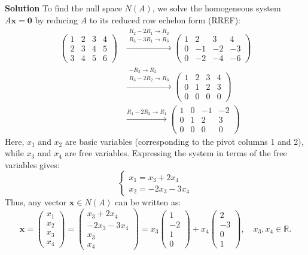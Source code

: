 \documentclass[12pt,a4paper]{article}
\begin{document}
\textbf{Solution}
To find the null space $N(A)$, we solve the homogeneous system $A\mathbf{x} = \mathbf{0}$ by reducing $A$ to its reduced row echelon form (RREF):
\begin{align*}
	\begin{pmatrix}
		1 & 2 & 3 & 4\\
		2 & 3 & 4 & 5\\
		3 & 4 & 5 & 6
	\end{pmatrix}
	&\xrightarrow{\substack{R_2 - 2R_1 \to R_2 \\ R_3 - 3R_1 \to R_3}}
	\begin{pmatrix}
		1 & 2 & 3 & 4\\
		0 & -1 & -2 & -3\\
		0 & -2 & -4 & -6
	\end{pmatrix} \\
	&\xrightarrow{\substack{-R_2 \to R_2 \\ R_3 - 2R_2 \to R_3}}
	\begin{pmatrix}
		1 & 2 & 3 & 4\\
		0 & 1 & 2 & 3\\
		0 & 0 & 0 & 0
	\end{pmatrix} \\
	&\xrightarrow{R_1 - 2R_2 \to R_1}
	\begin{pmatrix}
		1 & 0 & -1 & -2\\
		0 & 1 & 2 & 3\\
		0 & 0 & 0 & 0
	\end{pmatrix}
\end{align*}
Here, $x_1$ and $x_2$ are basic variables (corresponding to the pivot columns 1 and 2), while $x_3$ and $x_4$ are free variables. Expressing the system in terms of the free variables gives:
\[
\begin{cases}
	x_1 = x_3 + 2x_4 \\
	x_2 = -2x_3 - 3x_4
\end{cases}
\]
Thus, any vector $\mathbf{x} \in N(A)$ can be written as:
\[
\mathbf{x} = \begin{pmatrix} x_1 \\ x_2 \\ x_3 \\ x_4 \end{pmatrix} 
= \begin{pmatrix} x_3 + 2x_4 \\ -2x_3 - 3x_4 \\ x_3 \\ x_4 \end{pmatrix} 
= x_3 \begin{pmatrix} 1 \\ -2 \\ 1 \\ 0 \end{pmatrix} + x_4 \begin{pmatrix} 2 \\ -3 \\ 0 \\ 1 \end{pmatrix}, \quad x_3, x_4 \in \mathbb{R}.
\]
\end{document}
